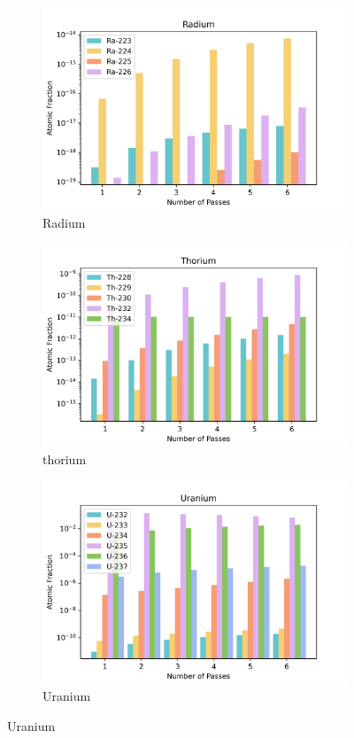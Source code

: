 \begin{figure}[h!]
\begin{subfigure}{0.25\textwidth}
  \includegraphics[width=0.95\linewidth]{figures/compositions/radium}
  \caption{Radium}
  \label{fig:ra}
\end{subfigure}%
%
\begin{subfigure}{0.25\textwidth}
  \includegraphics[width=0.95\linewidth]{figures/compositions/thorium}
  \caption{thorium}
  \label{fig:th}
\end{subfigure}%
%
\begin{subfigure}{0.25\textwidth}
  \includegraphics[width=0.95\linewidth]{figures/compositions/uranium}
  \caption{Uranium}
  \label{fig:u}
\end{subfigure}%


\end{figure}
